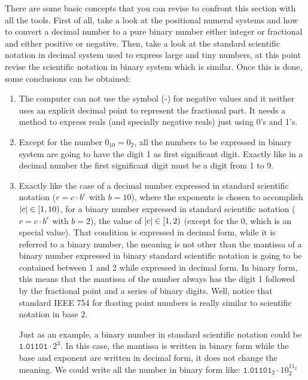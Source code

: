 \begin{IN}
    There are some basic concepts that you can revise to confront this section with all the tools. First of all, take a look at the positional numeral systems and how to convert a decimal number to a pure binary number either integer or fractional and either positive or negative. Then, take a look at the standard scientific notation in decimal system used to express large and tiny numbers, at this point revise the scientific notation in binary system which is similar. Once this is done, some conclusions can be obtained:
    \begin{enumerate}
        \item The computer can not use the symbol (-) for negative values and it neither uses an explicit decimal point to represent the fractional part. It needs a method to express reals (and specially negative reals) just using 0's and 1's.
        \item Except for the number $0_{10} = 0_{2}$, all the numbers to be expressed in binary system are going to have the digit 1 as first significant digit. Exactly like in a decimal number the first significant digit must be a digit from 1 to 9. 
        \item Exactly like the case of a decimal number expressed in standard scientific notation ($r=c\cdot b^e$ with $b=10$), where the exponents is chosen to accomplish $\abs{c}\in\left[ 1,10\right)$, for a binary number expressed in standard scientific notation ($r=c\cdot b^e$ with $b=2$), the value of $\abs{c}\in\left[ 1,2\right)$ (except for the 0, which is an special value). That condition is expressed in decimal form, while it is referred to a binary number, the meaning is not other than the mantissa of a binary number expressed in binary standard scientific notation is going to be contained  between 1 and 2 while expressed in decimal form. In binary form, this means that the mantissa of the number always has the digit 1 followed by the fractional point and a series of binary digits. Well, notice that standard IEEE 754 for floating point numbers is really similar to scientific notation in base 2. 
        
        Just as an example, a binary number in standard scientific notation could be $\texttt{1.01101}\cdot2^{3}$. In this case, the mantissa is written in binary form while the base and exponent are written in decimal form, it does not change the meaning. We could write all the number in binary form like: $\texttt{1.01101}_2 \cdot 10_2^{11_2}$
    \end{enumerate}
\end{IN}     

